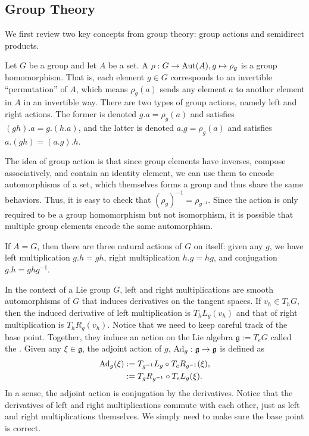 \documentclass[12pt,class=article,crop=false]{standalone}
\begin{document}
\subsection{Group Theory}
We first review two key concepts from group theory: group actions and semidirect products.
\begin{defn}
	Let $ G$ be a group and let  $ A$ be a set. A  $ \rho: G \to \operatorname{Aut} (A), g \mapsto \rho_g$ is a group homomorphism. That is, each element $ g \in G$ corresponds to an invertible ``permutation'' of $ A$, which means $ \rho_g(a)$ sends any element $ a$ to another element in $ A$ in an invertible way. There are two types of group actions, namely left and right actions. The former is denoted $ g.a = \rho_g(a)$ and satisfies $ (gh).a = g.(h.a)$, and the latter is denoted $ a .g = \rho_g(a)$ and satisfies $ a.(gh) = (a .g).h$.
\end{defn}
The idea of group action is that since group elements have inverses, compose associatively, and contain an identity element, we can use them to encode automorphisms of a set, which themselves forms a group and thus share the same behaviors. Thus, it is easy to check that $ (\rho_g)^{-1} = \rho_{g^{-1}}$. Since the action is only required to be a group homomorphism but not isomorphism, it is possible that multiple group elements encode the same automorphism.

If $ A = G$, then there are three natural actions of  $ G$ on itself: given any $ g$, we have left multiplication $ g.h = gh$, right multiplication $ h.g = hg$, and conjugation $ g.h = ghg^{-1}$.

In the context of a Lie group $ G$, left and right multiplications are smooth automorphisms of $ G$ that induces derivatives on the tangent spaces. If $ v_h \in T_hG $, then the induced derivative of left multiplication is $T_h L_g (v_h) $ and that of right multiplication is $ T_hR_g(v_h)$. Notice that we need to keep careful track of the base point. Together, they induce an action on the Lie algebra $ \mathfrak{g} := T_e G $ called the . Given any $ \xi \in \mathfrak{g} $, the adjoint action of $ g$, $ \operatorname{Ad}_{ g}: \mathfrak{g} \to \mathfrak{g} $ is defined as 
\begin{align*}
	\operatorname{Ad}_{ g}( \xi) &:= T_{g^{-1}} L_{g} \circ  T_e R_{g^{-1}} (\xi), \\
	&:= T_g R_{g^{-1}} \circ  T_e L_g (\xi) .
\end{align*}
In a sense, the adjoint action is conjugation by the derivatives. Notice that the derivatives of left and right multiplications commute with each other, just as left and right multiplications themselves. We simply need to make sure the base point is correct.
\end{document}
